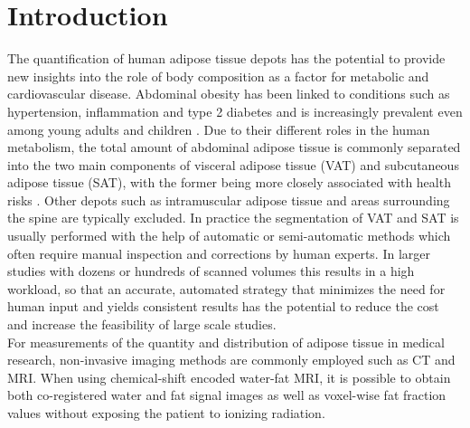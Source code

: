 \documentclass[10pt,letterpaper]{article}
\begin{document}
	\section*{Introduction}
	The quantification of human adipose tissue depots has the potential to provide new insights into the role of body composition as a factor for metabolic and cardiovascular disease. Abdominal obesity has been linked to conditions such as hypertension, inflammation and type 2 diabetes and is increasingly prevalent even among young adults and children \cite{despres2006abdominal}. Due to their different roles in the human metabolism, the total amount of abdominal adipose tissue is commonly separated into the two main components of visceral adipose tissue (VAT) and subcutaneous adipose tissue (SAT), with the former being more closely associated with health risks \cite{hu2016segmentation}. Other depots such as intramuscular adipose tissue and areas surrounding the spine are typically excluded. In practice the segmentation of VAT and SAT is usually performed with the help of automatic or semi-automatic methods which often require manual inspection and corrections by human experts. In larger studies with dozens or hundreds of scanned volumes this results in a high workload, so that an accurate, automated strategy that minimizes the need for human input and yields consistent results has the potential to reduce the cost and increase the feasibility of large scale studies.\\
	
	For measurements of the quantity and distribution of adipose tissue in medical research, non-invasive imaging methods are commonly employed such as CT and MRI. When using chemical-shift encoded water-fat MRI, it is possible to obtain both co-registered water and fat signal images as well as voxel-wise fat fraction values \cite{hu2013quantitative} without exposing the patient to ionizing radiation.
	
	
	
\end{document}
